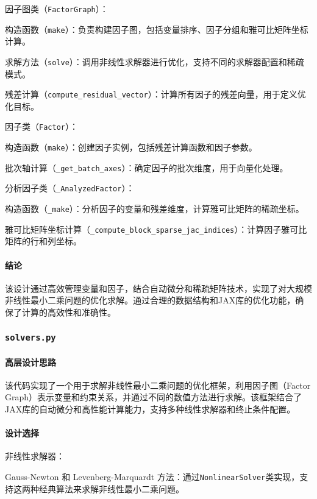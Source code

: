\documentclass{ctexart}
\begin{document}
因子图类（\texttt{FactorGraph}）：

构造函数（\texttt{make}）：负责构建因子图，包括变量排序、因子分组和雅可比矩阵坐标计算。

求解方法（\texttt{solve}）：调用非线性求解器进行优化，支持不同的求解器配置和稀疏模式。

残差计算（\texttt{compute\_residual\_vector}）：计算所有因子的残差向量，用于定义优化目标。

因子类（\texttt{Factor}）：

构造函数（\texttt{make}）：创建因子实例，包括残差计算函数和因子参数。

批次轴计算（\texttt{\_get\_batch\_axes}）：确定因子的批次维度，用于向量化处理。

分析因子类（\texttt{\_AnalyzedFactor}）：

构造函数（\texttt{\_make}）：分析因子的变量和残差维度，计算雅可比矩阵的稀疏坐标。

雅可比矩阵坐标计算（\texttt{\_compute\_block\_sparse\_jac\_indices}）：计算因子雅可比矩阵的行和列坐标。

\paragraph{结论}

该设计通过高效管理变量和因子，结合自动微分和稀疏矩阵技术，实现了对大规模非线性最小二乘问题的优化求解。通过合理的数据结构和JAX库的优化功能，确保了计算的高效性和准确性。

\subsubsection{\texttt{solvers.py}}

\paragraph{高层设计思路}

该代码实现了一个用于求解非线性最小二乘问题的优化框架，利用因子图（Factor Graph）表示变量和约束关系，并通过不同的数值方法进行求解。该框架结合了JAX库的自动微分和高性能计算能力，支持多种线性求解器和终止条件配置。

\paragraph{设计选择}

非线性求解器：

Gauss-Newton 和 Levenberg-Marquardt 方法：通过\texttt{NonlinearSolver}类实现，支持这两种经典算法来求解非线性最小二乘问题。
\end{document}
